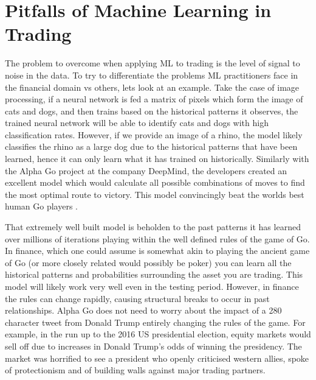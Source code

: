 \documentclass[11pt]{article}
\begin{document}
\section{Pitfalls of Machine Learning in Trading}
The problem to overcome when applying ML to trading is the level of signal to noise in the data. To try to differentiate the problems ML practitioners face in the financial domain vs others, lets look at an example. Take the case of image processing, if a neural network is fed a matrix of pixels which form the image of cats and dogs, and then trains based on the historical patterns it observes, the trained neural network will be able to identify cats and dogs with high classification rates. However, if we provide an image of a rhino, the model likely classifies the rhino as a large dog due to the historical patterns that have been learned, hence it can only learn what it has trained on historically. \newline Similarly with the Alpha Go project \cite{Silver2016} at the company DeepMind, the developers created an excellent model which would calculate all possible combinations of moves to find the most optimal route to victory. This model convincingly beat the worlds best human Go players \cite{leeSedol}.
\par
That extremely well built model is beholden to the past patterns it has learned over millions of iterations playing within the well defined rules of the game of Go. In finance, which one could assume is somewhat akin to playing the ancient game of Go (or more closely related would possibly be poker) you can learn all the historical patterns and probabilities surrounding the asset you are trading. This model will likely work very well even in the testing period. However, in finance the rules can change rapidly, causing structural breaks to occur in past relationships. Alpha Go does not need to worry about the impact of a 280 character tweet from Donald Trump entirely changing the rules of the game.\newline 
For example, in the run up to the 2016 US presidential election, equity markets would sell off due to increases in Donald Trump's odds of winning the presidency. The market was horrified to see a president who openly criticised western allies, spoke of protectionism and of building walls against major trading partners. 
\end{document}
